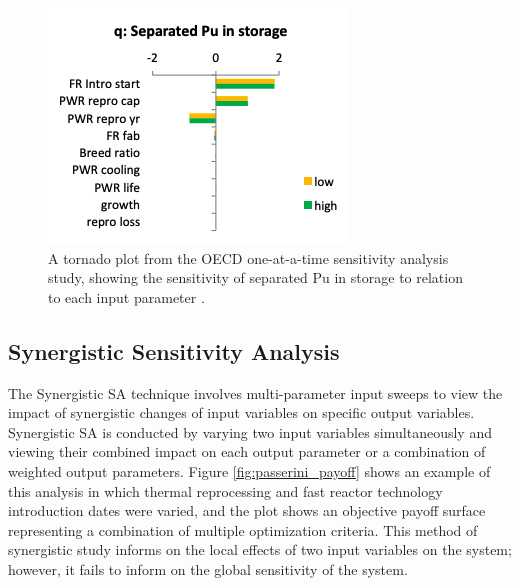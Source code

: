 \begin{figure}[]
	\begin{center}
		\includegraphics[scale=0.75]{./figures/oecd-tornado.png}
	\end{center}	
		\caption{A tornado plot from the OECD one-at-a-time sensitivity analysis 
        study, showing the sensitivity of separated Pu in 
		storage to relation to each input parameter \cite{noauthor_effects_2017}.}
	\label{fig:oecd-tornado}
\end{figure}

\subsection{Synergistic Sensitivity Analysis}
The Synergistic \gls{SA} technique involves multi-parameter 
input sweeps to view the impact of synergistic 
changes of input variables on specific output variables. 
Synergistic \gls{SA} is conducted by varying 
two input variables simultaneously and viewing their 
combined impact on each output parameter or a combination 
of weighted output parameters. 
Figure \ref{fig:passerini_payoff} shows an example of this analysis 
in which thermal reprocessing and fast reactor technology 
introduction dates were varied, and the plot shows an objective 
payoff surface representing a combination of multiple optimization 
criteria. 
This method of synergistic study informs on the local effects of 
two input variables on the system; however, it fails to inform 
on the global sensitivity of the system. 

